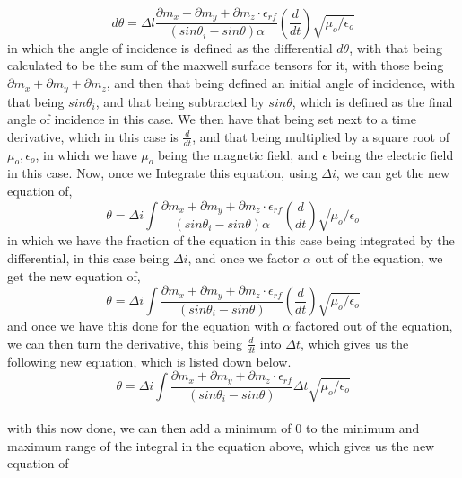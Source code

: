 \documentclass[]{article}
\begin{document}
\begin{equation}
d\theta = \Delta{l} \frac{\partial{m}_x+\partial{m}_y + \partial{m}_z \cdot \epsilon_{rf}}{(sin\theta_i - sin\theta)\alpha}\left(\frac{d}{dt}\right) \sqrt{\mu_o/\epsilon_o}
\end{equation}
in which the angle of incidence is defined as the differential $d\theta$, with that being calculated to be the sum of the maxwell surface tensors for it, with those being $\partial{m}_x + \partial{m}_y + \partial{m}_z$, and then that being defined an initial angle of incidence, with that being $sin\theta_i$, and that being subtracted by $sin\theta$, which is defined as the final angle of incidence in this case. We then have that being set next to a time derivative, which in this case is $\frac{d}{dt}$, and that being multiplied by a square root of $\mu_o, \epsilon_o$, in which we have $\mu_o$ being the magnetic field, and $\epsilon$ being the electric field in this case. Now, once we Integrate this equation, using $\Delta{i}$, we can get the new equation of,
\begin{equation}
\theta = \Delta{i}\int \frac{\partial{m}_x+\partial{m}_y + \partial{m}_z \cdot \epsilon_{rf}}{(sin\theta_i - sin\theta)\alpha} \left(\frac{d}{dt}\right) \sqrt{\mu_o/\epsilon_o}
\end{equation}
in which we have the fraction of the equation in this case being integrated by the differential, in this case being $\Delta{i}$, and once we factor $\alpha$ out of the equation, we get the new equation of,
\begin{equation}
\theta = \Delta{i}\int \frac{\partial{m}_x+\partial{m}_y + \partial{m}_z \cdot \epsilon_{rf}}{(sin\theta_i - sin\theta)} \left(\frac{d}{dt}\right)\sqrt{\mu_o/\epsilon_o}
\end{equation}
and once we have this done for the equation with $\alpha$ factored out of the equation, we can then turn the derivative, this being $\frac{d}{dt}$ into $\Delta{t}$, which gives us the following new equation, which is listed down below. 
\\
\begin{equation}
\theta = \Delta{i} \int \frac{\partial{m}_x+\partial{m}_y + \partial{m}_z \cdot \epsilon_{rf}}{(sin\theta_i - sin\theta)} \Delta{t} \sqrt{\mu_o/\epsilon_o}
\end{equation}
\\
with this now done, we can then add a minimum of $0$ to the minimum and maximum range of the integral in the equation above, which gives us the new equation of 
\\
\end{document}
